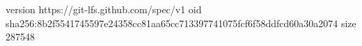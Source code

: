 version https://git-lfs.github.com/spec/v1
oid sha256:8b2f5541745597e24358cc81aa65cc713397741075fcf6f58ddfcd60a30a2074
size 287548
